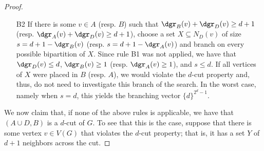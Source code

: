 \begin{proof}
\begin{itemize}


        \item[B2] If there is some $v \in A$ (resp. $B$) such that $\dgr_B(v) + \dgr_D(v) \geq d+1$ (resp. $\dgr_A(v) + \dgr_D(v) \geq d+1$), choose a set $X \subseteq N_D(v)$ of size $s = d+1 - \dgr_B(v)$ (resp. $s = d+1 - \dgr_A(v)$) and branch on every possible bipartition of $X$.
        Since rule B1 was not applied, we have that $\dgr_D(v) \leq d$, $\dgr_B(v) \geq 1$ (resp. $\dgr_A(v) \geq 1$), and $s \leq d$.
        If all vertices of $X$ were placed in $B$ (resp. $A$), we would violate the $d$-cut property and, thus, do not need to investigate this branch of the search.
        In the worst case, namely when $s = d$, this yields the branching vector $\{d\}^{2^d-1}$.
    \end{itemize}

    We now claim that, if none of the above rules is applicable, we have that $(A \cup D, B)$ is a $d$-cut of $G$.
    To see that this is the case, suppose that there is some vertex $v \in V(G)$ that violates the $d$-cut property; that is, it has a set $Y$ of $d+1$ neighbors across the cut.


\end{proof}
